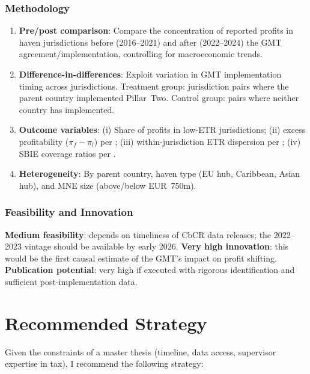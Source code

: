 \documentclass[11pt,a4paper]{article}
\begin{document}
\subsubsection{Methodology}
\begin{enumerate}[nosep]
    \item \textbf{Pre/post comparison}: Compare the concentration of reported profits in haven jurisdictions before (2016--2021) and after (2022--2024) the GMT agreement/implementation, controlling for macroeconomic trends.
    \item \textbf{Difference-in-differences}: Exploit variation in GMT implementation timing across jurisdictions. Treatment group: jurisdiction pairs where the parent country implemented Pillar~Two. Control group: pairs where neither country has implemented.
    \item \textbf{Outcome variables}: (i) Share of profits in low-ETR jurisdictions; (ii) excess profitability ($\pi_f - \pi_l$) per \citet{torslov2022}; (iii) within-jurisdiction ETR dispersion per \citet{hugger2025}; (iv) SBIE coverage ratios per \citet{devereux2023}.
    \item \textbf{Heterogeneity}: By parent country, haven type (EU hub, Caribbean, Asian hub), and MNE size (above/below EUR~750m).
\end{enumerate}

\subsubsection{Feasibility and Innovation}
\textbf{Medium feasibility}: depends on timeliness of CbCR data releases; the 2022--2023 vintage should be available by early 2026. \textbf{Very high innovation}: this would be the first causal estimate of the GMT's impact on profit shifting. \textbf{Publication potential}: very high if executed with rigorous identification and sufficient post-implementation data.


\section{Recommended Strategy}
\label{sec:strategy}


Given the constraints of a master thesis (timeline, data access, supervisor expertise in tax), I recommend the following strategy:
\end{document}
